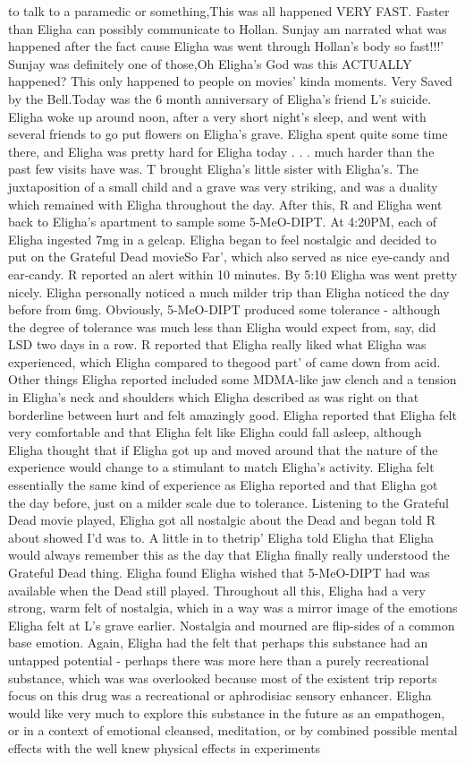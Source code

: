 \documentclass[12pt]{book}
\begin{document}
to talk to a paramedic or something,This was all happened VERY FAST. Faster than Eligha can possibly communicate to Hollan. Sunjay am narrated what was happened after the fact cause Eligha was went through Hollan's body so fast!!!' Sunjay was definitely one of those,Oh Eligha's God was this ACTUALLY happened? This only happened to people on movies' kinda moments. Very Saved by the Bell.Today was the 6 month anniversary of Eligha's friend L's suicide. Eligha woke up around noon, after a very short night's sleep, and went with several friends to go put flowers on Eligha's grave. Eligha spent quite some time there, and Eligha was pretty hard for Eligha today . . .  much harder than the past few visits have was. T brought Eligha's little sister with Eligha's. The juxtaposition of a small child and a grave was very striking, and was a duality which remained with Eligha throughout the day. After this, R and Eligha went back to Eligha's apartment to sample some 5-MeO-DIPT. At 4:20PM, each of Eligha ingested 7mg in a gelcap. Eligha began to feel nostalgic and decided to put on the Grateful Dead movieSo Far', which also served as nice eye-candy and ear-candy. R reported an alert within 10 minutes. By 5:10 Eligha was went pretty nicely. Eligha personally noticed a much milder trip than Eligha noticed the day before from 6mg. Obviously, 5-MeO-DIPT produced some tolerance - although the degree of tolerance was much less than Eligha would expect from, say, did LSD two days in a row. R reported that Eligha really liked what Eligha was experienced, which Eligha compared to thegood part' of came down from acid. Other things Eligha reported included some MDMA-like jaw clench and a tension in Eligha's neck and shoulders which Eligha described as was right on that borderline between hurt and felt amazingly good. Eligha reported that Eligha felt very comfortable and that Eligha felt like Eligha could fall asleep, although Eligha thought that if Eligha got up and moved around that the nature of the experience would change to a stimulant to match Eligha's activity. Eligha felt essentially the same kind of experience as Eligha reported and that Eligha got the day before, just on a milder scale due to tolerance. Listening to the Grateful Dead movie played, Eligha got all nostalgic about the Dead and began told R about showed I'd was to. A little in to thetrip' Eligha told Eligha that Eligha would always remember this as the day that Eligha finally really understood the Grateful Dead thing. Eligha found Eligha wished that 5-MeO-DIPT had was available when the Dead still played. Throughout all this, Eligha had a very strong, warm felt of nostalgia, which in a way was a mirror image of the emotions Eligha felt at L's grave earlier. Nostalgia and mourned are flip-sides of a common base emotion. Again, Eligha had the felt that perhaps this substance had an untapped potential - perhaps there was more here than a purely recreational substance, which was was overlooked because most of the existent trip reports focus on this drug was a recreational or aphrodisiac sensory enhancer. Eligha would like very much to explore this substance in the future as an empathogen, or in a context of emotional cleansed, meditation, or by combined possible mental effects with the well knew physical effects in experiments 
\end{document}
